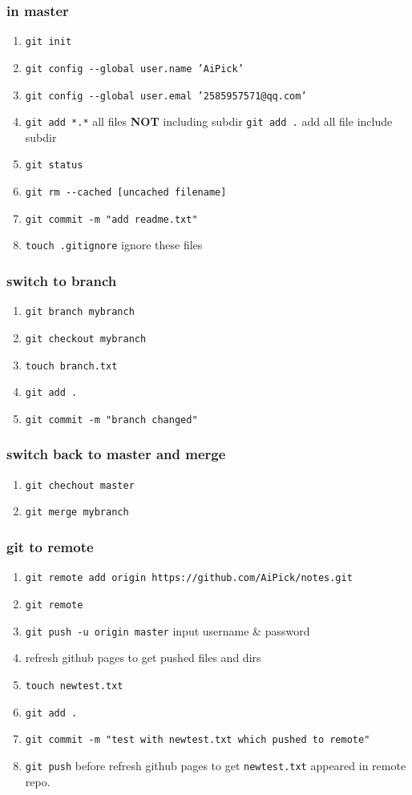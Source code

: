 \documentclass[11pt]{article}
\begin{document}
\subsubsection{in master}
\label{sec:orge479dec}
\begin{enumerate}
\item \texttt{git init}
\item \texttt{git config -{}-global user.name 'AiPick'}
\item \texttt{git config -{}-global user.emal '2585957571@qq.com'}
\item \texttt{git add *.*} all files \textbf{NOT} including subdir
\texttt{git add .}  add all file include subdir
\item \texttt{git status}
\item \texttt{git rm -{}-cached [uncached filename]}
\item \texttt{git commit -m "add readme.txt"}
\item \texttt{touch .gitignore} ignore these files
\end{enumerate}
\subsubsection{switch to branch}
\label{sec:orgdd8d5e4}
\begin{enumerate}
\item \texttt{git branch mybranch}
\item \texttt{git checkout mybranch}
\item \texttt{touch branch.txt}
\item \texttt{git add .}
\item \texttt{git commit -m "branch changed"}
\end{enumerate}
\subsubsection{switch back to master and merge}
\label{sec:orgf1991ae}
\begin{enumerate}
\item \texttt{git chechout master}
\item \texttt{git merge mybranch}
\end{enumerate}
\subsubsection{git to remote}
\label{sec:orgc295495}
\begin{enumerate}
\item \texttt{git remote add origin https://github.com/AiPick/notes.git}
\item \texttt{git remote}
\item \texttt{git push -u origin master}
input username \& password
\item refresh github pages to get pushed files and dirs
\item \texttt{touch newtest.txt}
\item \texttt{git add .}
\item \texttt{git commit -m "test with newtest.txt which pushed to remote"}
\item \texttt{git push} before refresh github pages to get \texttt{newtest.txt} appeared in remote repo.
\end{enumerate}
\end{document}
